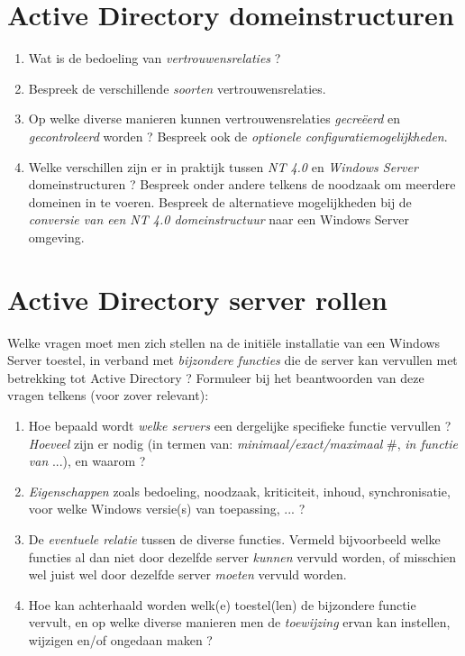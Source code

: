 \documentclass{report}
\begin{document}
 	\section{Active Directory domeinstructuren }
 	\begin{enumerate}
 		\item Wat is de bedoeling van \textit{vertrouwensrelaties} ?
 		
 		\item Bespreek de verschillende \textit{soorten} vertrouwensrelaties.
 		
 		\item Op welke diverse manieren kunnen vertrouwensrelaties \textit{gecreëerd} en \textit{gecontroleerd} worden ? Bespreek ook de \textit{optionele configuratiemogelijkheden}.
 		
 		\item Welke verschillen zijn er in praktijk tussen \textit{NT 4.0} en \textit{Windows Server} domeinstructuren ? Bespreek onder andere telkens de noodzaak om meerdere domeinen in te voeren. Bespreek de alternatieve mogelijkheden bij de \textit{conversie van een NT 4.0 domeinstructuur} naar een Windows Server omgeving.
 	\end{enumerate}
 
 	\section{Active Directory server rollen }
 		Welke vragen moet men zich stellen na de initiële installatie van een Windows Server toestel, in verband met \textit{bijzondere functies} die de server kan vervullen met betrekking tot Active Directory ? Formuleer bij het beantwoorden van deze vragen telkens (voor zover relevant): 
 		\begin{enumerate}
 			\item Hoe bepaald wordt \textit{welke servers} een dergelijke specifieke functie vervullen ? \textit{Hoeveel} zijn er nodig (in termen van: \textit{minimaal/exact/maximaal} \#, \textit{in functie van} ...), en waarom ?
 		
 			\item \textit{Eigenschappen} zoals bedoeling, noodzaak, kriticiteit, inhoud, synchronisatie, voor welke Windows versie(s) van toepassing, ... ?
 		
 			\item De \textit{eventuele relatie} tussen de diverse functies. Vermeld bijvoorbeeld welke functies al dan niet door dezelfde server \textit{kunnen} vervuld worden, of misschien wel juist wel door dezelfde server \textit{moeten} vervuld worden.
 		
 			\item Hoe kan achterhaald worden welk(e) toestel(len) de bijzondere functie vervult, en op welke diverse manieren men de \textit{toewijzing} ervan kan instellen, wijzigen en/of ongedaan maken ?
 		\end{enumerate}	
\end{document}
